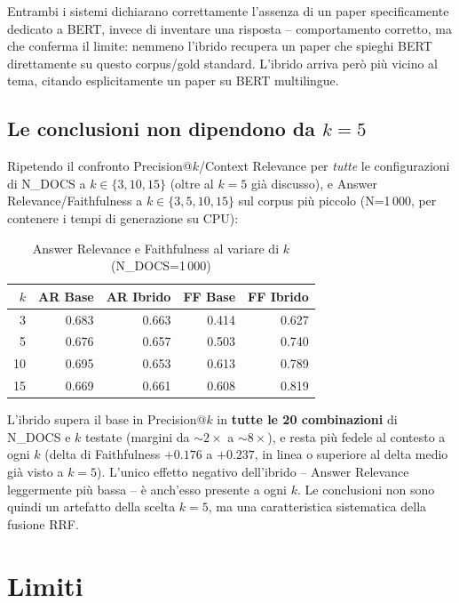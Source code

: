 \documentclass[12pt,a4paper]{article}
\begin{document}
Entrambi i sistemi dichiarano correttamente l'assenza di un paper specificamente dedicato a BERT, invece di inventare una risposta -- comportamento corretto, ma che conferma il limite: nemmeno l'ibrido recupera un paper che spieghi BERT direttamente su questo corpus/gold standard. L'ibrido arriva per\`o pi\`u vicino al tema, citando esplicitamente un paper su BERT multilingue.

\subsection{Le conclusioni non dipendono da $k=5$}
\label{sec:variazione-k}

Ripetendo il confronto Precision@$k$/Context Relevance per \emph{tutte} le configurazioni di N\_DOCS a $k \in \{3, 10, 15\}$ (oltre al $k=5$ gi\`a discusso), e Answer Relevance/Faithfulness a $k \in \{3,5,10,15\}$ sul corpus pi\`u piccolo (N=1\,000, per contenere i tempi di generazione su CPU):

\begin{table}[H]
  \centering
  \caption{Answer Relevance e Faithfulness al variare di $k$ (N\_DOCS=1\,000)}
  \begin{tabular}{rrrrr}
    \toprule
    \textbf{$k$} & \textbf{AR Base} & \textbf{AR Ibrido} & \textbf{FF Base} & \textbf{FF Ibrido} \\
    \midrule
    3  & 0.683 & 0.663 & 0.414 & 0.627 \\
    5  & 0.676 & 0.657 & 0.503 & 0.740 \\
    10 & 0.695 & 0.653 & 0.613 & 0.789 \\
    15 & 0.669 & 0.661 & 0.608 & 0.819 \\
    \bottomrule
  \end{tabular}
\end{table}

L'ibrido supera il base in Precision@$k$ in \textbf{tutte le 20 combinazioni} di N\_DOCS e $k$ testate (margini da ${\sim}2\times$ a ${\sim}8\times$), e resta pi\`u fedele al contesto a ogni $k$ (delta di Faithfulness $+0.176$ a $+0.237$, in linea o superiore al delta medio gi\`a visto a $k=5$). L'unico effetto negativo dell'ibrido -- Answer Relevance leggermente pi\`u bassa -- \`e anch'esso presente a ogni $k$. Le conclusioni non sono quindi un artefatto della scelta $k=5$, ma una caratteristica sistematica della fusione RRF.

\section{Limiti}
\label{sec:limiti}
\end{document}
